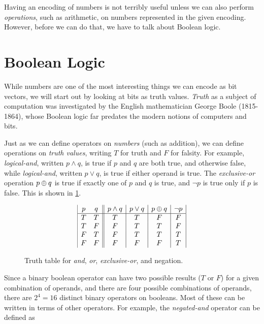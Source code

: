 Having an encoding of numbers is not terribly useful unless we can
also perform \emph{operations}, such as arithmetic, on numbers
represented in the given encoding.  However, before we can do that, we
have to talk about Boolean logic.

\section{Boolean Logic}
\label{sec:boolean-logic}

While numbers are one of the most interesting things we can encode as
bit vectors, we will start out by looking at bits as truth values.
\emph{Truth} as a subject of computation was investigated by the
English mathematician George Boole (1815-1864), whose Boolean logic
far predates the modern notions of computers and bits.

Just as we can define operators on \emph{numbers} (such as addition),
we can define operations on \emph{truth values}, writing $T$ for truth
and $F$ for falsity.  For example, \emph{logical-and}, written
$p \land q$, is true if $p$ and $q$ are both true, and otherwise
false, while \emph{logical-and}, written $p \lor q$, is true if either
operand is true.  The \emph{exclusive-or} operation $p \oplus q$ is
true if exactly one of $p$ and $q$ is true, and $\neg p$ is true only
if $p$ is false.  This is shown in \cref{fig:truth-tables}.

\begin{figure}
  \centering

  \begin{displaymath}
\begin{array}{|c c||c|c|c|c|}
p & q & p \land q & p \lor q & p \oplus q & \neg p \\
\hline
T & T & T & T & F & F\\
T & F & F & T & T & F\\
F & T & F & T & T & T\\
F & F & F & F & F & T\\
\end{array}
\end{displaymath}
  \caption{Truth table for \emph{and}, \emph{or}, \emph{exclusive-or}, and negation.}
  \label{fig:truth-tables}
\end{figure}

Since a binary boolean operator can have two possible results ($T$ or
$F$) for a given combination of operands, and there are four possible
combinations of operands, there are $2^{4}=16$ distinct binary
operators on booleans.  Most of these can be written in terms of other
operators.  For example, the \emph{negated-and} operator can be defined as

